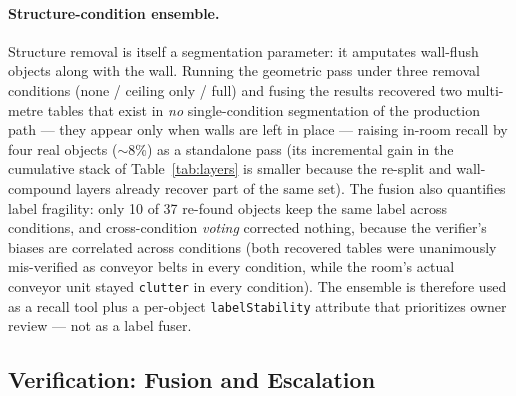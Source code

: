 \paragraph{Structure-condition ensemble.}
Structure removal is itself a segmentation parameter: it amputates
wall-flush objects along with the wall. Running the geometric pass
under three removal conditions (none / ceiling only / full) and fusing
the results recovered two multi-metre tables that exist in \emph{no}
single-condition segmentation of the production path --- they appear
only when walls are left in place --- raising in-room recall by four
real objects ($\sim$8\%) as a standalone pass (its incremental gain in
the cumulative stack of Table~\ref{tab:layers} is smaller because the
re-split and wall-compound layers already recover part of the same set). The fusion also quantifies label fragility:
only 10 of 37 re-found objects keep the same label across conditions,
and cross-condition \emph{voting} corrected nothing, because the
verifier's biases are correlated across conditions (both recovered
tables were unanimously mis-verified as conveyor belts in every
condition, while the room's actual conveyor unit stayed
\texttt{clutter} in every condition). The ensemble is therefore used as
a recall tool plus a per-object \texttt{labelStability} attribute that
prioritizes owner review --- not as a label fuser.

\subsection{Verification: Fusion and Escalation}
\label{sec:exp-verify}

